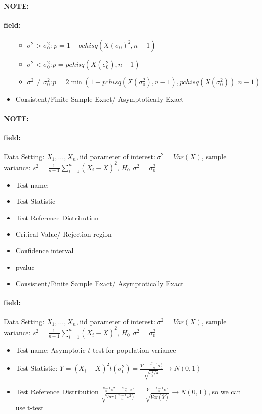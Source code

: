 \documentclass[12pt]{article}
\newenvironment{note}{\paragraph{NOTE:}}{}
\newenvironment{field}{\paragraph{field:}}{}
\begin{document}
\begin{note}
\begin{field}
\begin{itemize}
      \begin{itemize}
        \item $\sigma^2 > \sigma_0^2$: $p = 1 - pchisq(X(\sigma_0)^2,n-1)$
        \item $\sigma^2 < \sigma_0^2: p = pchisq(X(\sigma_0^2),n-1)$
        \item $\sigma^2 \neq \sigma_0^2: p = 2\min(1 - pchisq(X(\sigma_0^2), n-1), pchisq(X(\sigma_0^2)),n-1)$
      \end{itemize}
      \item Consistent/Finite Sample Exact/ Asymptotically Exact
    \end{itemize}
  \end{field}
\end{note}

\begin{note}
  \begin{field}
    Data Setting: $X_1, \ldots, X_n$, iid parameter of interest: $\sigma^2 = Var(X)$, sample variance: $s^2 = \frac{1}{n-1} \sum_{i=1}^n(X_i - \bar{X})^2$, $H_0: \sigma^2 = \sigma_0^2$
    \begin{itemize}
      \item Test name:
      \item Test Statistic
      \item Test Reference Distribution
      \item Critical Value/ Rejection region
      \item Confidence interval
      \item pvalue
      \item Consistent/Finite Sample Exact/ Asymptotically Exact
    \end{itemize}
  \end{field}
  \begin{field}
    Data Setting: $X_1, \ldots, X_n$, iid parameter of interest: $\sigma^2 = Var(X)$, sample variance: $s^2 = \frac{1}{n-1} \sum_{i=1}^n(X_i - \bar{X})^2$, $H_0: \sigma^2 = \sigma_0^2$
    \begin{itemize}
      \item Test name: Asymptotic $t$-test for population variance
      \item Test Statistic: $Y = (X_i - \bar{X})^2 t(\sigma_0^2)  = \frac{\bar{Y - \frac{n-1}{n}\sigma_0^2}}{\sqrt{s_y^2/n}} \to N(0,1)$
      \item Test Reference Distribution $ \frac{\frac{n-1}{n}s^2 - \frac{n-1}{n}\sigma^2}{\sqrt{Var(\frac{n-1}{n}s^2)}} = \frac{\bar{Y}- \frac{n-1}{n}\sigma^2}{\sqrt{Var(\bar{Y})}} \to N(0,1)$, so we can use t-test

\end{itemize}
\end{field}
\end{note}
\end{document}
